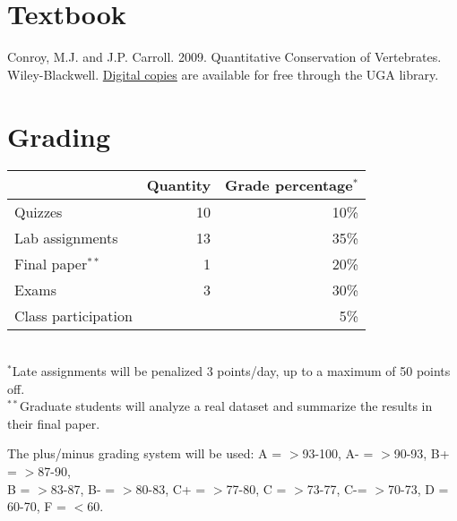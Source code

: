 \documentclass[12pt]{article}
\begin{document}
\vspace{-3mm}
\section*{\normalsize Textbook}
\vspace{-4mm}
Conroy, M.J. and J.P. Carroll. 2009. Quantitative Conservation of
Vertebrates. Wiley-Blackwell. \href{http://preproxy.galib.uga.edu/login?url=http://onlinelibrary.wiley.com/book/10.1002/9781444303155}{Digital
  copies} are available for free through the UGA library. 

\vspace{-3mm}
\section*{\normalsize Grading}
\vspace{-4mm}
\begin{center}
  \begin{tabular}[h!]{lrr}
    \hline
                        & Quantity & Grade percentage$^*$        \\
    \hline
    Quizzes             & 10       & 10\%                        \\
    Lab assignments     & 13       & 35\%                        \\
    Final paper$^{**}$  & 1        & 20\%                        \\
    Exams               & 3        & 30\%                        \\
    Class participation &          & 5\%                         \\
    \hline
  \end{tabular}                                                  \\
  \small
\hspace{0mm} $^*$Late assignments will be penalized 3 points/day, up to a maximum of 50 points off. \\ 
\hspace{0mm} $^{**}$Graduate students will analyze a real dataset and
summarize the results in their final paper.
\end{center}
\vspace{-6pt}
{%
The plus/minus grading system will be used: %
A = $>$93-100, A- = $>$90-93, B+ = $>$87-90,                     \\ B = $>$83-87,
B- = $>$80-83, C+ = $>$77-80, C = $>$73-77, C-= $>$70-73, D = 60-70, F = $<$60. 
}
\end{document}
